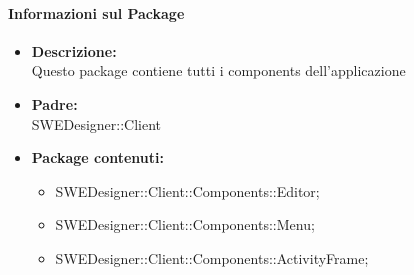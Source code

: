 		\paragraph{Informazioni sul Package}
		\begin{itemize}
			\item \textbf{Descrizione: }\\
			Questo package contiene tutti i components dell'applicazione
			\item \textbf{Padre: }\\ SWEDesigner::Client
			\item \textbf{Package contenuti: }
			\begin{itemize}
				\item SWEDesigner::Client::Components::Editor;
				\item SWEDesigner::Client::Components::Menu;
				\item SWEDesigner::Client::Components::ActivityFrame;
			\end{itemize}
		\end{itemize}

